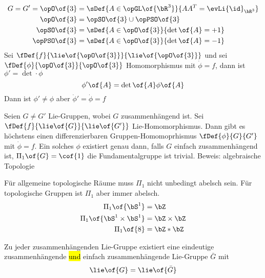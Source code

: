 \begin{beispiel}
	\begin{equation}
		\begin{split}
			G = G' = \opO\of{3} & = \sDef{A\in\opGL\of{\bR^3}}{AA^{T} = \evLi{\id}_{\bR^3}} \\
			\opO\of{3} & = \opSO\of{3} \cup \opPSO\of{3} \\
			\opSO\of{3} & = \sDef{A\in\opO\of{3}}{\det\of{A} = +1} \\
			\opPSO\of{3} & = \sDef{A\in\opO\of{3}}{\det\of{A} = -1} \\
		\end{split}
	\end{equation}
	Sei $\fDef{f}{\lie\of{\opO\of{3}}}{\lie\of{\opO\of{3}}}$ und sei $\fDef{\phi}{\opO\of{3}}{\opO\of{3}}$ Homomorphismus mit $\dot{\phi} = f$, dann ist $\phi' = \det\cdot\phi$
	\begin{equation}
		\phi'\of{A} = \det\of{A} \phi\of{A}
	\end{equation}
	Dann ist $\phi' \neq \phi$ aber $\dot{\phi}' = \dot{\phi} = f$
\end{beispiel}
\begin{proposition}
	Seien $G \neq G'$ Lie-Gruppen, wobei $G$ zusammenhängend ist. Sei $\fDef{f}{\lie\of{G}}{\lie\of{G'}}$ Lie-Homomorphismus. Dann gibt es höchstens einen differenzierbaren Gruppen-Homomoprhismus $\fDef{\phi}{G}{G'}$ mit $\dot{\phi} = f$. Ein solches $\phi$ existiert genau dann, falls $G$ einfach zusammenhängend ist, \dah $\Pi_1\of{G} = \cof{1}$ die Fundamentalgruppe ist trivial. Beweis: algebraische Topologie
\end{proposition}
\begin{bemerkung}
	Für allgemeine topologische Räume muss $\Pi_1$ nicht unbedingt abelsch sein. Für topologische Gruppen ist $\Pi_1$ aber immer abelsch.
	\begin{equation}
		\begin{split}
			\Pi_1\of{\bS^1} & = \bZ \\
			\Pi_1\of{\bS^1\times\bS^1} & = \bZ\times\bZ \\
			\Pi_1\of{8} & = \bZ * \bZ
		\end{split}
	\end{equation}
\end{bemerkung}
Zu jeder zusammenhängenden Lie-Gruppe existiert eine eindeutige zusammenhängende \hl{und} einfach zusammenhängende Lie-Gruppe $\bar{G}$ mit 
\begin{equation}
	\lie\of{G} = \lie\of{\bar{G}}
\end{equation}
